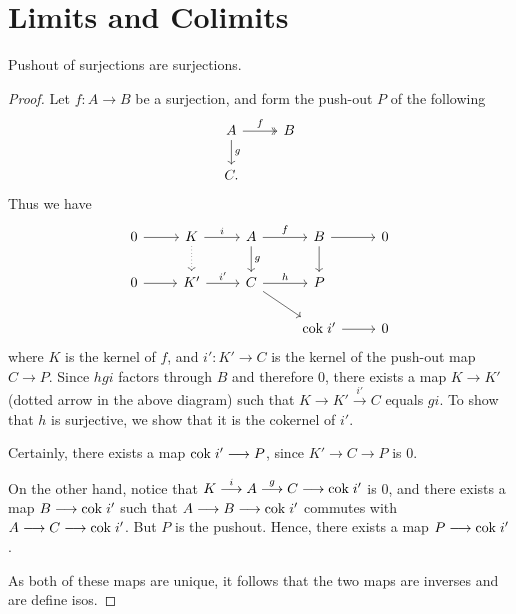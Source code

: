 \section{Limits and Colimits}
\begin{prop}\label{prop:pushout_epi}
Pushout of surjections are surjections.
\end{prop}

\begin{proof}
Let $f: A \to B$ be a surjection, and form the push-out $P$ of the 
following
\[
\begin{tikzcd}
A \arrow[twoheadrightarrow]{r}{f} \arrow{d}{g} &
B \\
C.
\end{tikzcd}
\]
Thus we have
\[
\begin{tikzcd}
0 \arrow{r} & 
K \arrow{r}{i}\arrow[dotted]{d} &
A \arrow{r}{f}\arrow{d}{g} &
B \arrow{r}\arrow{d}&
0 \\
0 \arrow{r} &
K' \arrow{r}{i'} &
C \arrow{r}{h} \arrow{rd}&
P \\
& & &\cok i' \arrow{r} &
0
\end{tikzcd}
\]
where $K$ is the kernel of $f$, and $i': K' \to C$ is the kernel 
of the push-out map $C \to P$. Since $hgi$ factors through $B$
and therefore $0$, there exists a map $K \to K'$ (dotted arrow
in the above diagram) such that $K \to K' \stackrel{i'}{\to} C$
equals $gi$. To show that $h$ is surjective, we show that it is 
the cokernel of $i'$.

Certainly, there exists a map $\mathrm{cok}\; i' \longrightarrow P$, since $K' \to C 
\to P$ is 0. 

On the other hand, notice that $K \stackrel{i}{\longrightarrow} A 
\stackrel{g}{\longrightarrow} C \longrightarrow \mathrm{cok}\; i'$ is 0, and there exists a map
$B \longrightarrow \mathrm{cok}\; i'$ such that $A \longrightarrow B \longrightarrow \mathrm{cok}\; i'$ commutes with
$A \longrightarrow C \longrightarrow \mathrm{cok}\; i'$. But $P$ is the pushout. Hence, there
exists a map $P \longrightarrow \mathrm{cok}\; i'$. 

As both of these maps are unique, it follows that the two maps
are inverses and are define isos.
\end{proof}
